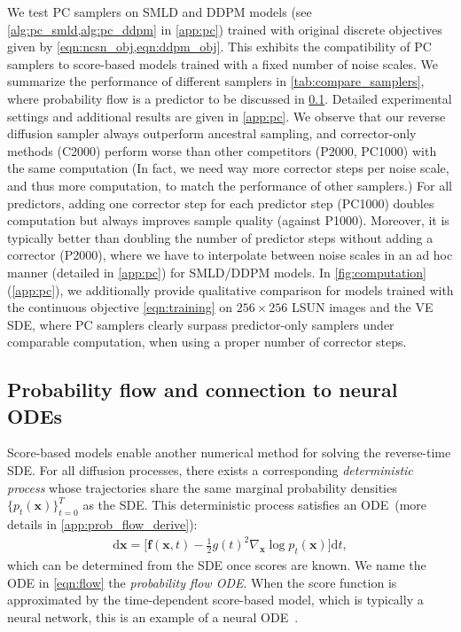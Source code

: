 \documentclass{article} %
\newcommand{\ud}{\mathrm{d}}
\newcommand{\bfx}{\mathbf{x}}
\newcommand{\bff}{\mathbf{f}}
\begin{document}
We test PC samplers on SMLD and DDPM models (see \cref{alg:pc_smld,alg:pc_ddpm} in \cref{app:pc}) trained with original discrete objectives given by \cref{eqn:ncsn_obj,eqn:ddpm_obj}. %
This exhibits the compatibility of PC samplers to score-based models trained with a fixed number of noise scales. We summarize the performance of different samplers in \cref{tab:compare_samplers}, where probability flow is a predictor to be discussed in \cref{sec:flow}. Detailed experimental settings and additional results are given in \cref{app:pc}. We observe that our reverse diffusion sampler always outperform ancestral sampling, and corrector-only methods (C2000) perform worse than other competitors (P2000, PC1000) with the same computation (In fact, we need way more corrector steps per noise scale, and thus more computation, to match the performance of other samplers.) For all predictors, adding one corrector step for each predictor step (PC1000) doubles computation but always improves sample quality (against P1000). Moreover, it is typically better than doubling the number of predictor steps without adding a corrector (P2000), where we have to interpolate between noise scales in an ad hoc manner (detailed in \cref{app:pc}) for SMLD/DDPM models. In \cref{fig:computation} (\cref{app:pc}), we additionally provide qualitative comparison for models trained with the continuous objective \cref{eqn:training} on $256\times 256$ LSUN images and the VE SDE, where PC samplers clearly surpass predictor-only samplers under comparable computation, when using a proper number of corrector steps.








\subsection{Probability flow and connection to neural ODEs}\label{sec:flow}
Score-based models enable another numerical method for solving the reverse-time SDE. For all diffusion processes, there exists a corresponding \emph{deterministic process} whose trajectories share the same marginal probability densities $\{p_t(\bfx)\}_{t=0}^T$ as the SDE. This deterministic process satisfies an ODE~(more details in \cref{app:prob_flow_derive}):
\begin{align}
    \ud \bfx = \Big[\bff(\bfx, t) - \frac{1}{2} g(t)^2\nabla_\bfx \log p_t(\bfx)\Big] \ud t, \label{eqn:flow}
\end{align}
which can be determined from the SDE once scores are known. We name the ODE in \cref{eqn:flow} the \emph{probability flow ODE}.
When the score function is approximated by the time-dependent score-based model, which is typically a neural network, this is an example of a neural ODE~\citep{chen2018neural}. 
\end{document}
